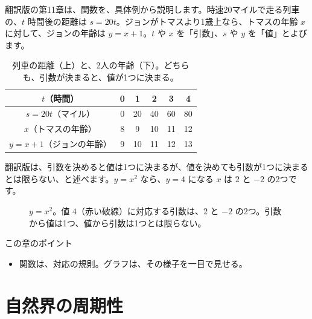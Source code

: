 \documentclass[a4paper,11pt,openany]{ltjsbook}
\begin{document}
翻訳版の第11章は、関数を、具体例から説明します。時速20マイルで走る列車の、$t$ 時間後の距離は $s=20t$。ジョンがトマスより1歳上なら、トマスの年齢 $x$ に対して、ジョンの年齢は $y=x+1$。$t$ や $x$ を「引数」、$s$ や $y$ を「値」とよびます。

\begin{table}[htbp]
\centering
\begin{tabular}{c|ccccc}
\toprule
$t$（時間） & 0 & 1 & 2 & 3 & 4\\
\midrule
$s=20t$（マイル） & 0 & 20 & 40 & 60 & 80\\
\midrule
$x$（トマスの年齢） & 8 & 9 & 10 & 11 & 12\\
$y=x+1$（ジョンの年齢） & 9 & 10 & 11 & 12 & 13\\
\bottomrule
\end{tabular}
\caption{列車の距離（上）と、2人の年齢（下）。どちらも、引数が決まると、値が1つに決まる。}
\end{table}

翻訳版は、引数を決めると値は1つに決まるが、値を決めても引数が1つに決まるとは限らない、と述べます。$y=x^2$ なら、$y=4$ になる $x$ は $2$ と $-2$ の2つです。

\begin{figure}[htbp]
\centering
{}
\caption{$y=x^2$。値 $4$（赤い破線）に対応する引数は、$2$ と $-2$ の2つ。引数から値は1つ、値から引数は1つとは限らない。}
\end{figure}

\begin{pointbox}{この章のポイント}
\begin{itemize}[leftmargin=1.5em]
\item 関数は、対応の規則。グラフは、その様子を一目で見せる。
\end{itemize}
\end{pointbox}

\chapter{自然界の周期性}
\end{document}
